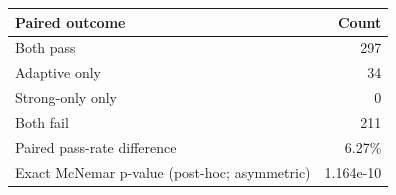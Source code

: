 \begin{tabular}{lr}
\toprule
Paired outcome & Count \\
\midrule
Both pass & 297 \\
Adaptive only & 34 \\
Strong-only only & 0 \\
Both fail & 211 \\
\midrule
Paired pass-rate difference & 6.27\% \\
Exact McNemar p-value (post-hoc; asymmetric) & 1.164e-10 \\
\bottomrule
\end{tabular}
